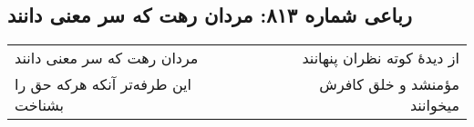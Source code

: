 \begin{center}
\section*{رباعی شماره ۸۱۳: مردان رهت که سر معنی دانند}
\label{sec:0813}
\begin{longtable}{l p{0.5cm} r}
مردان رهت که سر معنی دانند
&&
از دیدهٔ کوته نظران پنهانند
\\
این طرفه‌تر آنکه هرکه حق را بشناخت
&&
مؤمنشد و خلق کافرش میخوانند
\\
\end{longtable}
\end{center}
